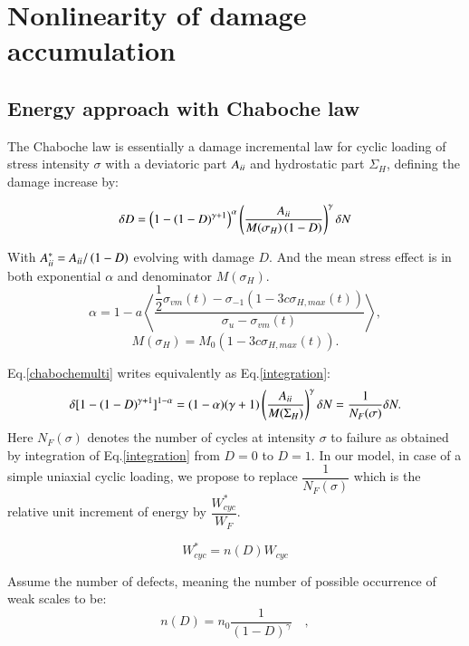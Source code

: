 \documentclass[3p,times,number,review]{elsarticle}
\begin{document}
\section{Nonlinearity of damage accumulation}
\subsection{Energy approach with Chaboche law}
The Chaboche law\cite{lemaitre1990mechanics} is essentially a damage incremental law for cyclic loading of stress intensity $\sigma$ with a deviatoric part ${A}_{\uppercase\expandafter{\romannumeral2}}$ and hydrostatic part $\Sigma_H$, defining the damage increase by:

 \begin{equation}\delta D = \left( 1 -(1-D)^{\gamma+1}\right)^\alpha \left(\frac{{A}_{\uppercase\expandafter{\romannumeral2}} }{M(\sigma_H)\left( 1-D\right)}\right)^\gamma \delta N
 \label{chabochemulti}
 \end{equation} 
 
With ${A}_{\uppercase\expandafter{\romannumeral2}}^*={A}_{\uppercase\expandafter{\romannumeral2}}/\left( 1-D\right) $ evolving with damage $D$. And the mean stress effect is in both exponential $\alpha$ and denominator $M(\sigma_H)$.
$$\alpha=1 - a\left\langle \dfrac{\dfrac{1}{2}\sigma_{vm}(t)-\sigma_{-1}\left(1-3c\sigma_{H,max}(t) \right) }{\sigma_{u} -\sigma_{vm}(t)}\right\rangle,$$
$$M(\sigma_H) =M_0 \left(1-3c\sigma_{H,max}(t) \right).$$
 
Eq.\eqref{chabochemulti} writes equivalently as Eq.\eqref{integration}:
   \begin{equation}\delta [1-(1-D)^{\gamma+1}]^{1-\alpha}=(1-\alpha)(\gamma+1)\left(\dfrac{{A}_{\uppercase\expandafter{\romannumeral2}} }{M(\Sigma_H)}\right)^\gamma \delta N=\dfrac{1}{N_F(\sigma)}\delta N.
   \label{integration}
   \end{equation}
Here $N_F(\sigma)$ denotes the number of cycles at intensity $\sigma$ to failure as obtained by integration of Eq.\eqref{integration} from $D=0$ to $D=1$. In our model, in case of a simple uniaxial cyclic loading, we propose to replace $\dfrac{1}{N_F(\sigma)}$ which is the relative unit increment of energy by $\dfrac{W_{cyc}^*}{W_F}$.

$$W_{cyc}^*=n(D)W_{cyc}$$

Assume the number of defects, meaning the number of possible occurrence of weak scales to be:
\begin{equation}
n(D)=n_0\dfrac{1}{\left(1-D \right)^\gamma} \quad,
\label{defect}
\end{equation} 
\end{document}
